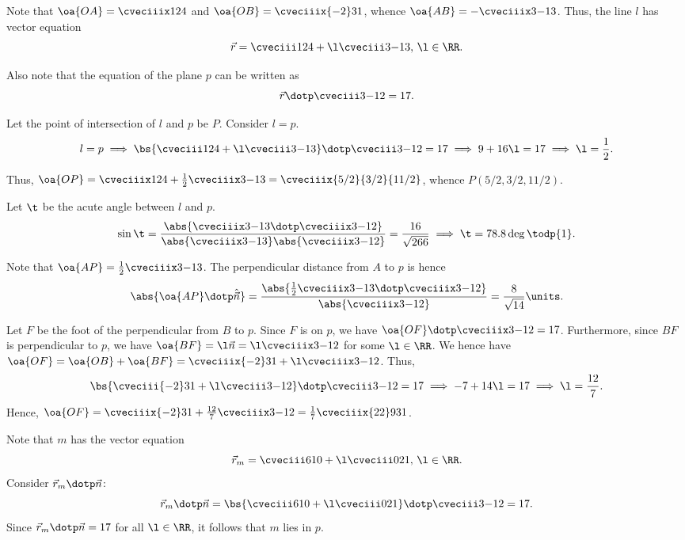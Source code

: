 \begin{solution}
    Note that $\oa{OA} = \cveciiix124$ and $\oa{OB} = \cveciiix{-2}31$, whence $\oa{AB} = -\cveciiix3{-1}3$. Thus, the line $l$ has vector equation \[\vec r = \cveciii124 + \l\cveciii3{-1}3, \, \l \in \RR.\]

    Also note that the equation of the plane $p$ can be written as \[\vec r \dotp \cveciii3{-1}2 = 17.\]

    \begin{ppart}
        Let the point of intersection of $l$ and $p$ be $P$. Consider $l = p$. \[l = p \implies \bs{\cveciii124 + \l\cveciii3{-1}3} \dotp \cveciii3{-1}2 = 17 \implies 9 + 16\l = 17 \implies \l = \frac12.\]

        Thus, $\oa{OP} = \cveciiix124 + \frac12\cveciiix3{-1}3 = \cveciiix{5/2}{3/2}{11/2}$, whence $P(5/2, 3/2, 11/2)$.

    \end{ppart}
    \begin{ppart}
        Let $\t$ be the acute angle between $l$ and $p$. \[\sin\t = \frac{\abs{\cveciiix3{-1}3 \dotp \cveciiix3{-1}2}}{\abs{\cveciiix3{-1}3} \abs{\cveciiix3{-1}2}} = \frac{16}{\sqrt{266}} \implies \t = 78.8 \deg \todp{1}.\]
    \end{ppart}
    \begin{ppart}
        Note that $\oa{AP} = \frac12 \cveciiix3{-1}3$. The perpendicular distance from $A$ to $p$ is hence \[\abs{\oa{AP} \dotp \hat{\vec n}} = \frac{\abs{\frac12\cveciiix3{-1}3 \dotp \cveciiix3{-1}2}}{\abs{\cveciiix3{-1}2}} = \frac8{\sqrt{14}} \units.\]
    \end{ppart}
    \begin{ppart}
        Let $F$ be the foot of the perpendicular from $B$ to $p$. Since $F$ is on $p$, we have $\oa{OF} \dotp \cveciiix3{-1}2 = 17$. Furthermore, since $BF$ is perpendicular to $p$, we have $\oa{BF} = \l \vec n = \l \cveciiix3{-1}2$ for some $\l \in \RR$. We hence have $\oa{OF} = \oa{OB} + \oa{BF} = \cveciiix{-2}31 + \l \cveciiix3{-1}2$. Thus, \[\bs{\cveciii{-2}31 + \l \cveciii3{-1}2} \dotp \cveciii3{-1}2 = 17 \implies -7 + 14\l = 17 \implies \l = \frac{12}7.\] Hence, $\oa{OF} = \cveciiix{-2}31 + \frac{12}7 \cveciiix3{-1}2 = \frac17\cveciiix{22}9{31}$.
    \end{ppart}
    \begin{ppart}
        Note that $m$ has the vector equation \[\vec r_m = \cveciii610 + \l \cveciii021, \, \l \in \RR.\] Consider $\vec r_m \dotp \vec n$: \[\vec r_m \dotp \vec n = \bs{\cveciii610 + \l \cveciii021} \dotp \cveciii3{-1}2 = 17.\] Since $\vec r_m \dotp \vec n = 17$ for all $\l \in \RR$, it follows that $m$ lies in $p$.
    \end{ppart}
\end{solution}

